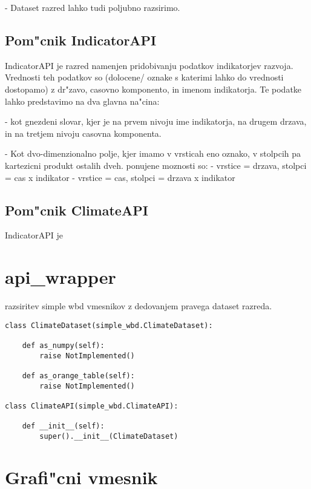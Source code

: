 - Dataset razred lahko tudi poljubno razsirimo.



\subsection{Pom"cnik IndicatorAPI}

IndicatorAPI je razred namenjen pridobivanju podatkov indikatorjev razvoja.
Vrednosti teh podatkov so (dolocene/ oznake s katerimi lahko do vrednosti
dostopamo) z dr"zavo, casovno komponento, in imenom indikatorja. Te podatke
lahko predstavimo na dva glavna na"cina:

 - kot gnezdeni slovar, kjer je na prvem nivoju ime indikatorja, na drugem
   drzava, in na tretjem nivoju casovna komponenta.

 - Kot dvo-dimenzionalno polje, kjer imamo v vrsticah eno oznako, v stolpcih
   pa kartezicni produkt ostalih dveh. ponujene moznosti so:
   - vrstice = drzava, stolpci = cas x indikator
   - vrstice = cas, stolpci = drzava x indikator






% 
% 
% 
% 
% 
% 


\subsection{Pom"cnik ClimateAPI}

IndicatorAPI je 



% 
% 



\section{api\_wrapper}



razsiritev simple wbd vmesnikov z dedovanjem pravega dataset razreda.

\begin{verbatim}
class ClimateDataset(simple_wbd.ClimateDataset):
    
    def as_numpy(self):
        raise NotImplemented()
    
    def as_orange_table(self):
        raise NotImplemented()

class ClimateAPI(simple_wbd.ClimateAPI):

    def __init__(self):
        super().__init__(ClimateDataset)
\end{verbatim}





\section{Grafi"cni vmesnik}


